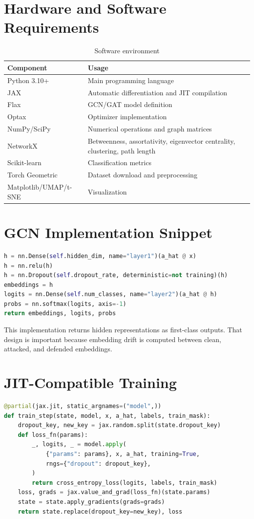 \documentclass[12pt,oneside]{report}
\begin{document}
\section{Hardware and Software Requirements}
\begin{table}[H]
\centering
\caption{Software environment}
\begin{tabular}{p{1.8in}p{3.5in}}
\toprule
\textbf{Component} & \textbf{Usage}\\
\midrule
Python 3.10+ & Main programming language\\
JAX & Automatic differentiation and JIT compilation\\
Flax & GCN/GAT model definition\\
Optax & Optimizer implementation\\
NumPy/SciPy & Numerical operations and graph matrices\\
NetworkX & Betweenness, assortativity, eigenvector centrality, clustering, path length\\
Scikit-learn & Classification metrics\\
Torch Geometric & Dataset download and preprocessing\\
Matplotlib/UMAP/t-SNE & Visualization\\
\bottomrule
\end{tabular}
\end{table}

\section{GCN Implementation Snippet}
\begin{lstlisting}[language=Python,caption={GCN forward pass from models/gcn.py}]
h = nn.Dense(self.hidden_dim, name="layer1")(a_hat @ x)
h = nn.relu(h)
h = nn.Dropout(self.dropout_rate, deterministic=not training)(h)
embeddings = h
logits = nn.Dense(self.num_classes, name="layer2")(a_hat @ h)
probs = nn.softmax(logits, axis=-1)
return embeddings, logits, probs
\end{lstlisting}

This implementation returns hidden representations as first-class outputs. That design is important because embedding drift is computed between clean, attacked, and defended embeddings.

\section{JIT-Compatible Training}
\begin{lstlisting}[language=Python,caption={JIT-compiled training step from models/train.py}]
@partial(jax.jit, static_argnames=("model",))
def train_step(state, model, x, a_hat, labels, train_mask):
    dropout_key, new_key = jax.random.split(state.dropout_key)
    def loss_fn(params):
        _, logits, _ = model.apply(
            {"params": params}, x, a_hat, training=True,
            rngs={"dropout": dropout_key},
        )
        return cross_entropy_loss(logits, labels, train_mask)
    loss, grads = jax.value_and_grad(loss_fn)(state.params)
    state = state.apply_gradients(grads=grads)
    return state.replace(dropout_key=new_key), loss
\end{lstlisting}
\end{document}
